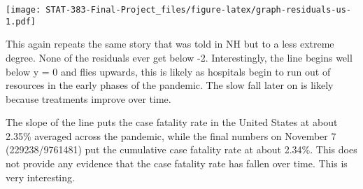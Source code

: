 \documentclass[
]{article}
\begin{document}
\texttt{[image: STAT-383-Final-Project\_files/figure-latex/graph-residuals-us-1.pdf]}

This again repeats the same story that was told in NH but to a less
extreme degree. None of the residuals ever get below -2. Interestingly,
the line begins well below y = 0 and flies upwards, this is likely as
hospitals begin to run out of resources in the early phases of the
pandemic. The slow fall later on is likely because treatments improve
over time.

The slope of the line puts the case fatality rate in the United States
at about 2.35\% averaged across the pandemic, while the final numbers on
November 7 (229238/9761481) put the cumulative case fatality rate at
about 2.34\%. This does not provide any evidence that the case fatality
rate has fallen over time. This is very interesting.
\end{document}
